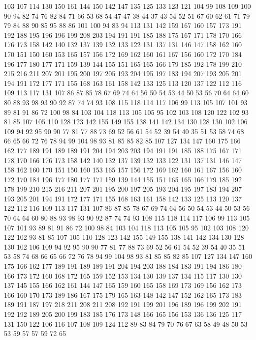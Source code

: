 103 107 114 130 150 161 144 150 142 147 135 125 133 123 121 104 99 108 109 100
90 94 82 74 76 82 84 71 66 53 68 54 47 47 38 44 37 43 54 52
51 67 60 62 61 71 79 79 84 88 90 85 95 88 86 101 100 94 83 94
113 131 142 159 167 160 157 173 191 192 188 195 196 196 199 208 203 194 191 191
185 188 175 167 171 178 170 166 176 173 158 142 140 132 137 139 132 133 122 131
137 131 146 147 158 162 160 170 151 150 160 153 165 157 156 172 169 162 160 161
167 156 160 172 170 184 196 177 180 177 171 159 139 144 155 151 165 165 166 179
185 192 178 199 210 215 216 211 207 201 195 200 197 205 193 204 195 197 183 194
207 193 205 201 194 191 172 177 171 155 168 163 161 158 142 133 125 113 120 137
122 112 116 109 113 117 131 107 86 87 85 78 67 69 74 64 56 50 54 53
44 50 53 56 70 64 64 60 80 88 93 98 93 90 92 87 74 74 93 108
115 118 114 117 106 99 113 105 107 101 93 89 81 91 86 72 100 98 84 103
104 118 113 105 105 95 102 103 108 120 122 102 93 81 85 107 105 110 128 123
142 155 149 155 138 141 142 134 130 128 130 102 106 109 94 92 95 90 90 77
81 77 88 73 69 52 56 61 54 52 39 54 40 35 51 53 58 74 68 66
65 66 72 76 78 94 99 104 98 93 81 85 85 82 85 107 127 134 147 160
175 166 162 177 189 191 189 189 191 204 194 203 203 194 191 191 185 188 175 167
171 178 170 166 176 173 158 142 140 132 137 139 132 133 122 131 137 131 146 147
158 162 160 170 151 150 160 153 165 157 156 172 169 162 160 161 167 156 160 172
170 184 196 177 180 177 171 159 139 144 155 151 165 165 166 179 185 192 178 199
210 215 216 211 207 201 195 200 197 205 193 204 195 197 183 194 207 193 205 201
194 191 172 177 171 155 168 163 161 158 142 133 125 113 120 137 122 112 116 109
113 117 131 107 86 87 85 78 67 69 74 64 56 50 54 53 44 50 53 56
70 64 64 60 80 88 93 98 93 90 92 87 74 74 93 108 115 118 114 117
106 99 113 105 107 101 93 89 81 91 86 72 100 98 84 103 104 118 113 105
105 95 102 103 108 120 122 102 93 81 85 107 105 110 128 123 142 155 149 155
138 141 142 134 130 128 130 102 106 109 94 92 95 90 90 77 81 77 88 73
69 52 56 61 54 52 39 54 40 35 51 53 58 74 68 66 65 66 72 76
78 94 99 104 98 93 81 85 85 82 85 107 127 134 147 160 175 166 162 177
189 191 189 189 191 204 194 203 188 184 183 191 194 186 180 166 173 172 160 168
172 165 159 152 153 134 130 139 137 134 115 117 130 130 137 145 155 166 162 161
144 147 165 159 160 165 158 169 173 169 156 162 173 166 160 170 173 189 186 167
175 179 165 163 148 142 147 152 162 165 173 183 189 191 187 197 218 211 208 211
208 192 191 199 201 196 189 196 199 202 191 192 192 189 205 200 199 183 185 176
173 148 166 165 156 153 136 136 125 117 131 150 122 106 116 107 108 109 124 112
89 83 84 79 70 76 67 63 58 49 48 50 53 53 59 57 57 59 72 65
